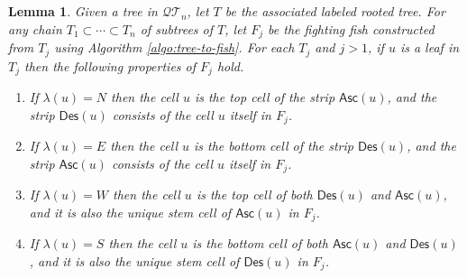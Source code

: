\documentclass[a4paper,11pt,reqno]{amsart}
\newtheorem{lem}{Lemma}[section]
\theoremstyle{definition}
\numberwithin{equation}{section}
\newcommand{\Des}{{\textsf{Des}}}
\newcommand{\Asc}{{\textsf{Asc}}}
\newcommand{\QT}{{\mathcal{QT}}}
\begin{document}
\begin{lem} \label{lem:leaf-cells} 
Given a tree in $\QT_n$, let $T$ be the associated labeled rooted tree. For any chain $T_1\subset\cdots\subset T_n$ of subtrees of $T$, let $F_j$ be the fighting fish constructed from $T_j$ using Algorithm \ref{algo:tree-to-fish}. 
For each $T_j$ and $j>1$, if $u$ is a leaf in $T_j$ then the following properties of $F_j$ hold.
\begin{enumerate}
\item If $\lambda(u)=N$ then the cell $u$ is the top cell of the strip $\Asc(u)$, and the strip $\Des(u)$ consists of the cell $u$ itself in $F_j$.
\item If $\lambda(u)=E$ then the cell $u$ is the bottom cell of the strip $\Des(u)$, and the strip $\Asc(u)$ consists of the cell $u$ itself in $F_j$.
\item If $\lambda(u)=W$ then the cell $u$ is the top cell of both $\Des(u)$ and $\Asc(u)$, and it is also the unique stem cell of $\Asc(u)$ in $F_j$. 
\item If $\lambda(u)=S$ then the cell $u$ is the bottom cell of both $\Asc(u)$ and $\Des(u)$, and it is also the unique stem cell of $\Des(u)$ in $F_j$.
\end{enumerate}
\end{lem}
 
\end{document}
